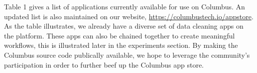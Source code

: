 Table 1 gives a list of applications currently available for use on Columbus. An updated 
list is also maintained on our website, \url{https://columbustech.io/appstore}. As the table 
illustrates, we already have a diverse set of data cleaning apps on the platform. These apps can 
also be chained together to create meaningful workflows, this is illustrated later in the 
experiments section. By making the Columbus source code publically available, we hope to leverage 
the community's participation in order to further beef up the Columbus app store.
